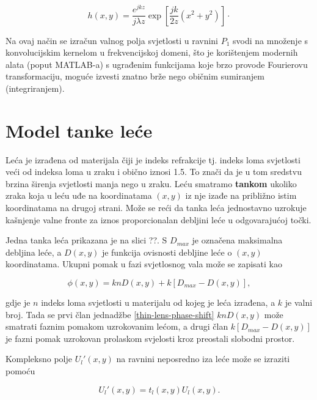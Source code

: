 \documentclass[times, utf8, diplomski, numeric]{fer}
\begin{document}
\begin{equation}
\label{Fresnel-conv-kernel}
h(x,y) = \frac{e^{jkz}}{j\lambda z}\exp \left[\frac{jk}{2z}(x^2 + y^2)\right] \cdotp
\end{equation}

Na ovaj način se izračun valnog polja svjetlosti u ravnini $P_1$ svodi na množenje s konvolucijskim kernelom u frekvencijskoj domeni, što je korištenjem modernih alata (poput MATLAB-a) s ugrađenim funkcijama koje brzo provode Fourierovu transformaciju, moguće izvesti znatno brže nego običnim sumiranjem (integriranjem).


\section{Model tanke leće}

Leća je izrađena od materijala čiji je indeks refrakcije tj. indeks loma svjetlosti veći od indeksa loma u zraku i obično iznosi 1.5. To znači da je u tom sredstvu brzina širenja svjetlosti manja nego u zraku. Leću smatramo \textbf{tankom} ukoliko zraka koja u leću uđe na koordinatama $(x,y)$ iz nje izađe na približno istim koordinatama na drugoj strani. Može se reći da tanka leća jednostavno uzrokuje kašnjenje valne fronte za iznos proporcionalan debljini leće u odgovarajućoj točki. 

Jedna tanka leća prikazana je na slici ??. S $D_{max}$ je označena maksimalna debljina leće, a $D(x,y)$ je funkcija ovisnosti debljine leće o $(x,y)$ koordinatama. Ukupni pomak u fazi svjetlosnog vala može se zapisati kao

\begin{equation}
\label{thin-lens-phase-shift}
\phi(x,y) = knD(x,y) + k\left[D_{max} - D(x,y)\right],
\end{equation}

gdje je $n$ indeks loma svjetlosti u materijalu od kojeg je leća izrađena, a $k$ je valni broj. Tada se prvi član jednadžbe \ref{thin-lens-phase-shift} $knD(x,y)$ može smatrati faznim pomakom uzrokovanim lećom, a drugi član $k\left[D_{max} - D(x,y)\right]$ je fazni pomak uzrokovan prolaskom svjelosti kroz preostali slobodni prostor.

Kompleksno polje $U_l'(x,y)$ na ravnini neposredno iza leće može se izraziti pomoću

\begin{equation}
	\label{lens-complex-field}
	U_l'(x,y) = t_l(x,y)U_l(x,y).
\end{equation}
\end{document}
